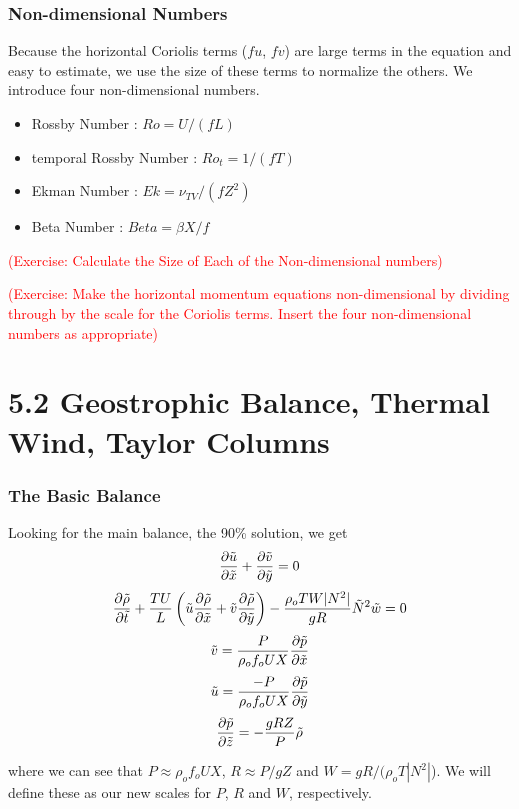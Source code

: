 \documentclass[xcolor=dvipsnames]{beamer}
\begin{document}
\begin{frame}
  \frametitle{Non-dimensional Numbers}   %
Because the horizontal Coriolis terms ($fu$, $fv$) are large terms in the equation and easy to estimate, we use the size of these terms to normalize the others.  We introduce four non-dimensional numbers. 
\begin{itemize}
\item Rossby Number : $Ro = U/(fL)$
\item temporal Rossby Number : $Ro_t = 1/(fT)$
\item Ekman Number : $Ek = \nu_{TV} /(f Z^2)$
\item Beta Number : $Beta = \beta X / f$
\end{itemize}

  \textcolor{red}{(Exercise: Calculate the Size of Each of the Non-dimensional numbers)}

\textcolor{red}{(Exercise: Make the horizontal momentum equations non-dimensional by dividing through by the scale for the Coriolis terms.  Insert the four non-dimensional numbers as appropriate)}
\end{frame}

\section{5.2 Geostrophic Balance, Thermal Wind, Taylor Columns}

\begin{frame}
\frametitle{The Basic Balance}
Looking for the main balance, the 90\% solution, we get
\begin{equation}
\frac{\partial \tilde u}{\partial \tilde x} + \frac{\partial \tilde v}{\partial \tilde y} = 0
\end{equation}
\begin{equation}
\frac{\partial \tilde \rho}{\partial \tilde t} + \frac{TU}{L} \left( \tilde u \frac{\partial \tilde \rho}{\partial \tilde x} +\tilde v \frac{\partial \tilde \rho}{\partial \tilde y} \right) - \frac{\rho_o TW |N^2|}{gR} \tilde N^2  \tilde w =0
\end{equation}
\begin{equation}
\tilde v = \frac{P}{\rho_o f_o UX} \frac{\partial \tilde p}{\partial \tilde x}
\end{equation}
\begin{equation}
\tilde u = \frac{-P}{\rho_o f_o UX} \frac{\partial \tilde p}{\partial \tilde y}
\end{equation}
\begin{equation}
\frac{\partial \tilde p}{\partial \tilde z} = -\frac{gRZ}{P} \tilde \rho 
\end{equation}

where we can see that $P \approx \rho_o f_o UX$, $R \approx P/gZ$ and $W = gR/(\rho_o T |N^2|$).  We will define these as our new scales for $P$, $R$ and $W$, respectively.

\end{frame}
\end{document}
